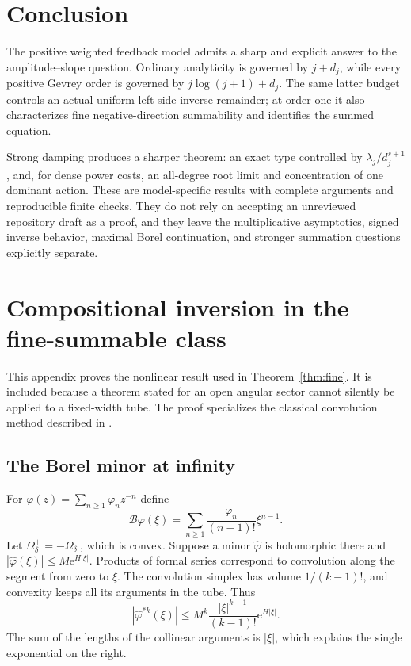 \documentclass[11pt,a4paper]{article}
\numberwithin{equation}{section}
\theoremstyle{definition}
\theoremstyle{remark}
\theoremstyle{definition}
\newcommand{\e}{\mathrm e}
\begin{document}
\section{Conclusion}
The positive weighted feedback model admits a sharp and explicit answer
to the amplitude--slope question. Ordinary analyticity is governed by
$j+d_j$, while every positive Gevrey order is governed by
$j\log(j+1)+d_j$. The same latter budget controls an actual uniform
left-side inverse remainder; at order one it also characterizes fine
negative-direction summability and identifies the summed equation.

Strong damping produces a sharper theorem: an exact type controlled by
$\lambda_j/d_j^{s+1}$, and, for dense power costs, an all-degree root
limit and concentration of one dominant action. These are model-specific
results with complete arguments and reproducible finite checks. They do
not rely on accepting an unreviewed repository draft as a proof, and
they leave the multiplicative asymptotics, signed inverse behavior,
maximal Borel continuation, and stronger summation questions explicitly
separate.

\appendix
\section{Compositional inversion in the fine-summable class}
\label{app:inverse}

This appendix proves the nonlinear result used in
Theorem~\ref{thm:fine}. It is included because a theorem stated for an
open angular sector cannot silently be applied to a fixed-width tube.
The proof specializes the classical convolution method described in
\cite{sauzin}.

\subsection{The Borel minor at infinity}
For $\varphi(z)=\sum_{n\ge1}\varphi_n z^{-n}$ define
\[
 \mathscr B\varphi(\xi)=\sum_{n\ge1}
                \frac{\varphi_n}{(n-1)!}\xi^{n-1}.
\]
Let $\Omega^+_\delta=-\Omega^-_\delta$, which is convex. Suppose a minor
$\widehat\varphi$ is holomorphic there and
$|\widehat\varphi(\xi)|\le M\e^{H|\xi|}$. Products of formal series
correspond to convolution along the segment from zero to $\xi$.
The convolution simplex has volume $1/(k-1)!$, and convexity keeps
all its arguments in the tube. Thus
\begin{equation}
 |\widehat\varphi^{*k}(\xi)|
 \le M^k\frac{|\xi|^{k-1}}{(k-1)!}\e^{H|\xi|}.
 \label{eq:convolution-bound}
\end{equation}
The sum of the lengths of the collinear arguments is $|\xi|$, which
explains the single exponential on the right.
\end{document}
